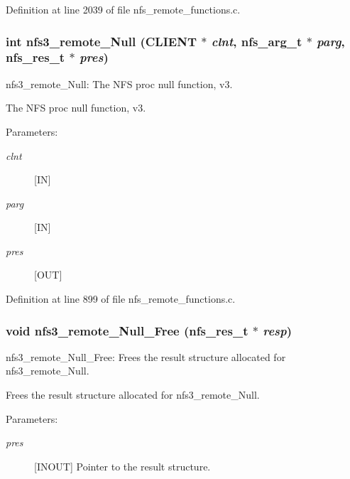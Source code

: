 Definition at line 2039 of file nfs\_\-remote\_\-functions.c.
\subsubsection[{nfs3\_\-remote\_\-Null}]{\setlength{\rightskip}{0pt plus 5cm}int nfs3\_\-remote\_\-Null (CLIENT $\ast$ {\em clnt}, \/  nfs\_\-arg\_\-t $\ast$ {\em parg}, \/  nfs\_\-res\_\-t $\ast$ {\em pres})}\label{group__NFSprocs_g01c9b0d1d8af14aa4f856053dbf524b6}


nfs3\_\-remote\_\-Null: The NFS proc null function, v3.

The NFS proc null function, v3.

\begin{Desc}
\item[Parameters:]
\begin{description}
\item[{\em clnt}][IN] \item[{\em parg}][IN] \item[{\em pres}][OUT] \end{description}
\end{Desc}


Definition at line 899 of file nfs\_\-remote\_\-functions.c.
\subsubsection[{nfs3\_\-remote\_\-Null\_\-Free}]{\setlength{\rightskip}{0pt plus 5cm}void nfs3\_\-remote\_\-Null\_\-Free (nfs\_\-res\_\-t $\ast$ {\em resp})}\label{group__NFSprocs_g0a08fff74b398494e4ffa49671558820}


nfs3\_\-remote\_\-Null\_\-Free: Frees the result structure allocated for nfs3\_\-remote\_\-Null.

Frees the result structure allocated for nfs3\_\-remote\_\-Null.

\begin{Desc}
\item[Parameters:]
\begin{description}
\item[{\em pres}][INOUT] Pointer to the result structure. \end{description}
\end{Desc}


